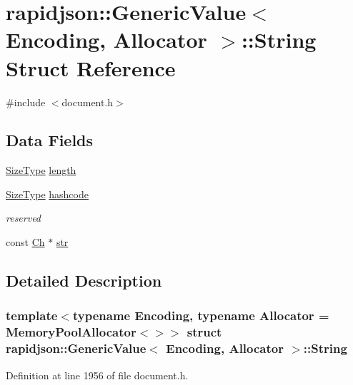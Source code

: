 \hypertarget{structrapidjson_1_1_generic_value_1_1_string}{}\section{rapidjson\+::Generic\+Value$<$ Encoding, Allocator $>$\+::String Struct Reference}
\label{structrapidjson_1_1_generic_value_1_1_string}


{\ttfamily \#include $<$document.\+h$>$}

\subsection*{Data Fields}
\begin{DoxyCompactItemize}
\item 
\mbox{\hyperlink{namespacerapidjson_a44eb33eaa523e36d466b1ced64b85c84}{Size\+Type}} \mbox{\hyperlink{structrapidjson_1_1_generic_value_1_1_string_a6f4161f0e7c64602cd882552e1081946}{length}}
\item 
\mbox{\hyperlink{namespacerapidjson_a44eb33eaa523e36d466b1ced64b85c84}{Size\+Type}} \mbox{\hyperlink{structrapidjson_1_1_generic_value_1_1_string_ad152cf5021ffbcaa8dcafea401ac5260}{hashcode}}
\begin{DoxyCompactList}\small\item\em reserved \end{DoxyCompactList}\item 
const \mbox{\hyperlink{classrapidjson_1_1_generic_value_adcdbc7fa85a9a41b78966d7e0dcc2ac4}{Ch}} $\ast$ \mbox{\hyperlink{structrapidjson_1_1_generic_value_1_1_string_a80454c0a6f9451f7d37916e04c899ff4}{str}}
\end{DoxyCompactItemize}


\subsection{Detailed Description}
\subsubsection*{template$<$typename Encoding, typename Allocator = Memory\+Pool\+Allocator$<$$>$$>$\newline
struct rapidjson\+::\+Generic\+Value$<$ Encoding, Allocator $>$\+::\+String}



Definition at line 1956 of file document.\+h.



